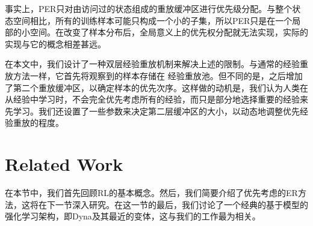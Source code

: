 
事实上，PER只对由访问过的状态组成的重放缓冲区进行优先级分配。与整个状态空间相比，所有的训练样本可能只构成一个小的子集，所以PER只是在一个局部的小空间。在改变了样本分布后，全局意义上的优先权分配就无法实现，实际的实现与它的概念相差甚远。


在本文中，我们设计了一种双层经验重放机制来解决上述的限制。与通常的经验重放方法一样，它首先将观察到的样本存储在
经验重放池。但不同的是，之后增加了第二个重放缓冲区，以确定样本的优先次序。这样做的动机是，我们认为人类在从经验中学习时，不会完全优先考虑所有的经验，而只是部分地选择重要的经验来先学习。我们还设置了一些参数来决定第二层缓冲区的大小，以动态地调整优先经验重放的程度。

\section{Related Work} \label{sec:Background}


在本节中，我们首先回顾RL的基本概念。然后，我们简要介绍了优先考虑的ER方法，这将在下一节深入研究。在这一节的最后，我们讨论了一个经典的基于模型的强化学习架构，即Dyna\cite{sutton1991integrated}及其最近的变体，这与我们的工作最为相关。

